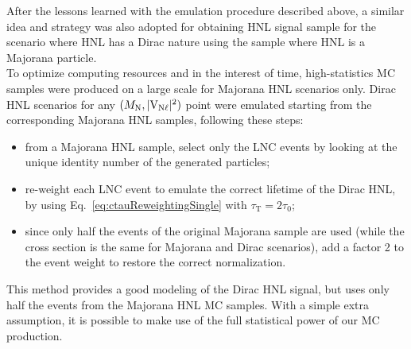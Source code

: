 After the lessons learned with the emulation procedure described 
above, a similar idea and strategy
was also adopted for obtaining HNL signal sample for the scenario where HNL has a Dirac nature using the sample where HNL is a Majorana particle.\\
To optimize computing resources and in the interest of time,
high-statistics MC samples were produced on a large scale for Majorana
HNL scenarios only.
Dirac HNL scenarios for any $(M_{\mathrm{N}},\mathrm{|V_{\mathrm{N}\ell}|^2})$ point were emulated
starting from the corresponding Majorana HNL samples, following these
steps:
\begin{itemize}
\setlength\itemsep{-0.2em}
\item from a Majorana HNL sample, select only the LNC events by
  looking at the unique identity number of the generated particles;
\item re-weight each LNC event to emulate the correct lifetime of the
  Dirac HNL, by using Eq.~\ref{eq:ctauReweightingSingle} with
  $\tau_{\mathrm{T}}=2\tau_0$;
\item since only half the events of the original Majorana sample are
  used (while the cross section is the same for Majorana and Dirac
  scenarios), add a factor 2 to the event weight to restore the correct
  normalization.
\end{itemize}
This method provides a good modeling of the Dirac HNL signal, but
uses only half the events from the Majorana HNL MC samples. With a
simple extra assumption, it is possible to make use of the full
statistical power of our MC production.

